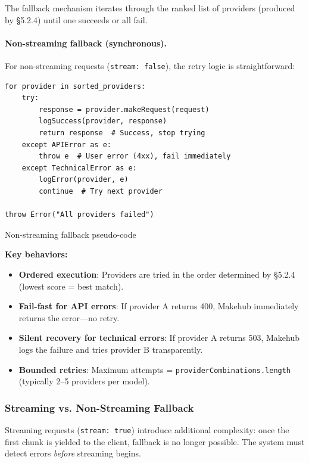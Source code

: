 \documentclass[english]{article}
\begin{document}
The fallback mechanism iterates through the ranked list of providers (produced by §5.2.4) until one succeeds or all fail.

\paragraph{Non-streaming fallback (synchronous).}

For non-streaming requests (\texttt{stream: false}), the retry logic is straightforward:

\begin{listing}[H]
\begin{verbatim}
for provider in sorted_providers:
    try:
        response = provider.makeRequest(request)
        logSuccess(provider, response)
        return response  # Success, stop trying
    except APIError as e:
        throw e  # User error (4xx), fail immediately
    except TechnicalError as e:
        logError(provider, e)
        continue  # Try next provider

throw Error("All providers failed")
\end{verbatim}
\caption{Non-streaming fallback pseudo-code}
\end{listing}

\textbf{Key behaviors:}
\begin{itemize}
    \item \textbf{Ordered execution}: Providers are tried in the order determined by §5.2.4 (lowest score = best match).
    \item \textbf{Fail-fast for API errors}: If provider A returns 400, Makehub immediately returns the error—no retry.
    \item \textbf{Silent recovery for technical errors}: If provider A returns 503, Makehub logs the failure and tries provider B transparently.
    \item \textbf{Bounded retries}: Maximum attempts = \texttt{providerCombinations.length} (typically 2--5 providers per model).
\end{itemize}

\subsubsection{Streaming vs. Non-Streaming Fallback}

Streaming requests (\texttt{stream: true}) introduce additional complexity: once the first chunk is yielded to the client, fallback is no longer possible. The system must detect errors \emph{before} streaming begins.
\end{document}
